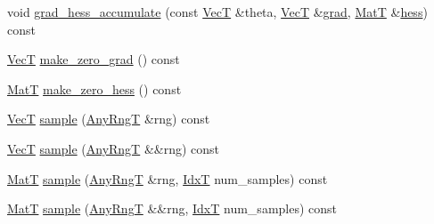 \begin{DoxyCompactItemize}
\item 
void \hyperlink{classprior__hessian_1_1CompositeDist_a3ad4ba9da5767951e5f0832c37f3ecff}{grad\+\_\+hess\+\_\+accumulate} (const \hyperlink{namespaceprior__hessian_a0b42fc70dec525d83fb2ac155d9ab974}{VecT} \&theta, \hyperlink{namespaceprior__hessian_a0b42fc70dec525d83fb2ac155d9ab974}{VecT} \&\hyperlink{classprior__hessian_1_1CompositeDist_aaa6bfd95f5914c0f68d67cd97ff40db3}{grad}, \hyperlink{namespaceprior__hessian_aab58331a34ed4ef22b6022564fe74be3}{MatT} \&\hyperlink{classprior__hessian_1_1CompositeDist_ab8c1ff058081ab81620e24b0e3e85f5d}{hess}) const 
\item 
\hyperlink{namespaceprior__hessian_a0b42fc70dec525d83fb2ac155d9ab974}{VecT} \hyperlink{classprior__hessian_1_1CompositeDist_ac27bd3125d941aa9e83b2c900e63d4fc}{make\+\_\+zero\+\_\+grad} () const 
\item 
\hyperlink{namespaceprior__hessian_aab58331a34ed4ef22b6022564fe74be3}{MatT} \hyperlink{classprior__hessian_1_1CompositeDist_ab92419cbc26b5fdd32cf5edffe54453f}{make\+\_\+zero\+\_\+hess} () const 
\item 
\hyperlink{namespaceprior__hessian_a0b42fc70dec525d83fb2ac155d9ab974}{VecT} \hyperlink{classprior__hessian_1_1CompositeDist_a1c1f82106a3a330df530cced07f08171}{sample} (\hyperlink{classprior__hessian_1_1CompositeDist_aa770eb02f04ec95a1e32044bb071281b}{Any\+RngT} \&rng) const 
\item 
\hyperlink{namespaceprior__hessian_a0b42fc70dec525d83fb2ac155d9ab974}{VecT} \hyperlink{classprior__hessian_1_1CompositeDist_acbd295a55225fcf86afd63eb13d7ce69}{sample} (\hyperlink{classprior__hessian_1_1CompositeDist_aa770eb02f04ec95a1e32044bb071281b}{Any\+RngT} \&\&rng) const 
\item 
\hyperlink{namespaceprior__hessian_aab58331a34ed4ef22b6022564fe74be3}{MatT} \hyperlink{classprior__hessian_1_1CompositeDist_a87ccb33a7025426aede11ffb90b3feac}{sample} (\hyperlink{classprior__hessian_1_1CompositeDist_aa770eb02f04ec95a1e32044bb071281b}{Any\+RngT} \&rng, \hyperlink{namespaceprior__hessian_aa8d589f74e88bfa3b5750118acd1ab78}{IdxT} num\+\_\+samples) const 
\item 
\hyperlink{namespaceprior__hessian_aab58331a34ed4ef22b6022564fe74be3}{MatT} \hyperlink{classprior__hessian_1_1CompositeDist_a264db2f89290a1d53f42ab017ae23d32}{sample} (\hyperlink{classprior__hessian_1_1CompositeDist_aa770eb02f04ec95a1e32044bb071281b}{Any\+RngT} \&\&rng, \hyperlink{namespaceprior__hessian_aa8d589f74e88bfa3b5750118acd1ab78}{IdxT} num\+\_\+samples) const 
\item 

\end{DoxyCompactItemize}
